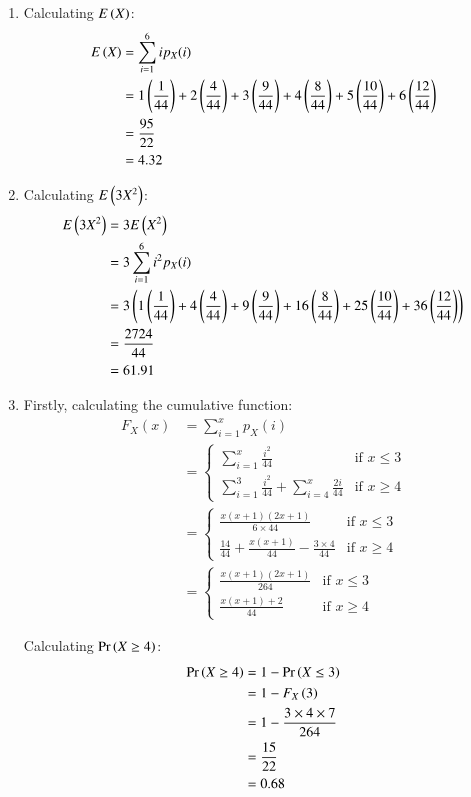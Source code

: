 \documentclass[journal,24pt,onecolumn]{IEEEtran}
\theoremstyle{remark}
\begin{document}
\begin{enumerate}
    \item Calculating $E\left(X\right)$:
    \begin{align}
        E\left(X\right) 
        &= \sum_{i = 1}^{6} ip_X(i)\\
        &= 1\left(\frac{1}{44}\right) + 2\left(\frac{4}{44}\right) + 3\left(\frac{9}{44}\right) + 4\left(\frac{8}{44}\right) + 5\left(\frac{10}{44}\right) + 6\left(\frac{12}{44}\right)\\
        &= \frac{95}{22}\\
        &= 4.32
    \end{align}
    \item Calculating $E\left(3X^2\right)$:
    \begin{align}
        E\left(3X^2\right) &= 3E\left(X^2\right)\\
        &= 3\sum_{i = 1}^{6} i^2 p_{X}(i)\\
        &= 3\left(1\left(\frac{1}{44}\right) + 4\left(\frac{4}{44}\right) + 9\left(\frac{9}{44}\right) + 16\left(\frac{8}{44}\right) + 25\left(\frac{10}{44}\right) + 36\left(\frac{12}{44}\right)\right)\\
        &= \frac{2724}{44}\\
        &= 61.91
    \end{align}
    \item Firstly, calculating the cumulative function:
    \begin{align}
        F_X(x) &= \sum_{i = 1}^{x} p_X(i)\\ &= 
        \begin{cases}
            \sum_{i = 1}^{x} \frac{i^2}{44} & \text{if } x \leq 3\\
            \sum_{i = 1}^{3} \frac{i^2}{44} + \sum_{i = 4}^{x} \frac{2i}{44} & \text{if } x \geq 4
        \end{cases}\\
        &=
        \begin{cases}
            \frac{x(x+1)(2x+1)}{6 \times 44} & \text{if } x \leq 3\\
            \frac{14}{44} + \frac{x(x+1)}{44} - \frac{3 \times 4}{44} & \text{if } x \geq 4
        \end{cases}\\
        &=
        \begin{cases}
            \frac{x(x+1)(2x+1)}{264} & \text{if } x \leq 3\\
            \frac{x(x+1) + 2}{44} & \text{if } x \geq 4
        \end{cases}
    \end{align}
    
    Calculating $\Pr\left(X \geq 4\right)$:
    \begin{align}
        \Pr\left(X \geq 4\right) &= 1 - \Pr\left(X \leq 3\right)\\
        &= 1 - F_X\left(3\right)\\
        &= 1 - \frac{3 \times 4 \times 7}{264}\\
        &= \frac{15}{22}\\
        &= 0.68
    \end{align}
\end{enumerate}
\end{document}
